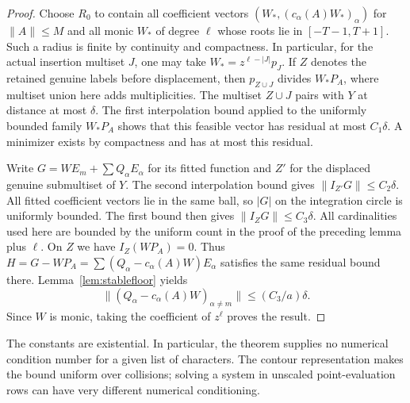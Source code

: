 \begin{proof}
Choose $R_0$ to contain all coefficient vectors
$(W_*,(c_\alpha(A)W_*)_\alpha)$ for $\|A\|\le M$ and all monic $W_*$ of degree $\ell$ whose roots lie in $[-T-1,T+1]$. Such a radius is finite by continuity and compactness. In particular, for the actual insertion multiset $J$, one may take $W_*=z^{\ell-|J|}p_J$. If $Z$ denotes the retained genuine labels before displacement, then $p_{Z\cup J}$ divides $W_*P_A$, where multiset union here adds multiplicities. The multiset $Z\cup J$ pairs with $Y$ at distance at most $\delta$. The first interpolation bound applied to the uniformly bounded family $W_*P_A$ shows that this feasible vector has residual at most $C_1\delta$. A minimizer exists by compactness and has at most this residual.

Write $G=W E_m+\sum Q_\alpha E_\alpha$ for its fitted function and $Z'$ for the displaced genuine submultiset of $Y$. The second interpolation bound gives $\|I_{Z'}G\|\le C_2\delta$. All fitted coefficient vectors lie in the same ball, so $|G|$ on the integration circle is uniformly bounded. The first bound then gives $\|I_ZG\|\le C_3\delta$. All cardinalities used here are bounded by the uniform count in the proof of the preceding lemma plus $\ell$. On $Z$ we have $I_Z(WP_A)=0$. Thus $H=G-WP_A=\sum (Q_\alpha-c_\alpha(A)W)E_\alpha$ satisfies the same residual bound there. Lemma~\ref{lem:stablefloor} yields
\[
 \big\|(Q_\alpha-c_\alpha(A)W)_{\alpha\ne m}\big\|\le (C_3/a)\delta .
\]
Since $W$ is monic, taking the coefficient of $z^\ell$ proves the result.
\end{proof}

The constants are existential. In particular, the theorem supplies no numerical condition number for a given list of characters. The contour representation makes the bound uniform over collisions; solving a system in unscaled point-evaluation rows can have very different numerical conditioning.
